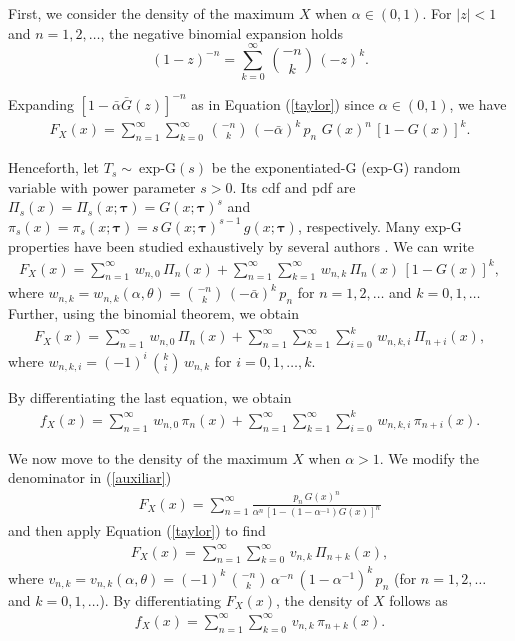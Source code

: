 \documentclass[12pt]{article}
\begin{document}
First, we consider the density of the maximum $X$ when $\alpha\in(0,1)$. For $|z|<1$ and $n=1,2,\ldots$, the negative binomial expansion holds
\begin{equation}\label{taylor}
(1-z)^{-n}=\sum^{\infty}_{k=0}\, {-n \choose k}\,(-z)^k.
\end{equation}

Expanding $\left[1-\bar{\alpha}\bar{G}(z)\right]^{-n}$ as in Equation (\ref{taylor}) since $\alpha\in(0,1)$, we have
\begin{eqnarray*}
F_X(x)=\sum_{n=1}^{\infty}\sum^{\infty}_{k=0}\, {-n \choose k}\,(-\bar{\alpha})^k\,p_n\,\,G(x)^n\,[1-G(x)]^k.
\end{eqnarray*}

Henceforth, let $T_{s}\sim~$exp-G$(s)$ be the exponentiated-G (exp-G) random variable with power parameter $s>0$. Its 
cdf and pdf are $\Pi_s(x)=\Pi_s(x;\bm{\tau})=G(x;\bm{\tau})^s$ and $\pi_s(x)=\pi_s(x;\bm{\tau})=s\,G(x;\bm{\tau})^{s-1}\,g(x;\bm{\tau})$,
respectively. Many exp-G properties have been studied exhaustively by se\-veral authors \citep{Tahir2015}. We can write
\begin{eqnarray*}
F_X(x)=\sum_{n=1}^{\infty}\,w_{n,0}\,\Pi_n(x) +\sum_{n=1}^{\infty}\sum^{\infty}_{k=1}\,w_{n,k}\,\Pi_n(x)\,[1-G(x)]^k,
\end{eqnarray*}
where $w_{n,k}=w_{n,k}(\alpha,\theta)={-n \choose k}\,(-\bar{\alpha})^k\,p_n$ for $n=1,2,\ldots$ and $k=0,1,\ldots$
Further, using the binomial theorem, we obtain
\begin{eqnarray*}
F_X(x)=\sum_{n=1}^{\infty}\,w_{n,0}\,\Pi_n(x) +\sum_{n=1}^{\infty}\sum^{\infty}_{k=1}\sum^{k}_{i=0}\,w_{n,k,i}\,\Pi_{n+i}(x),
\end{eqnarray*}
where $w_{n,k,i}=(-1)^i\,{k \choose i}\,w_{n,k}$ for $i=0,1,\ldots,k$.

By differentiating the last equation, we obtain
\begin{eqnarray}\label{densityX}
f_X(x)=\sum_{n=1}^{\infty}\,w_{n,0}\,\pi_n(x) +\sum_{n=1}^{\infty}\sum^{\infty}_{k=1}\sum^{k}_{i=0}\,w_{n,k,i}\,\pi_{n+i}(x).
\end{eqnarray}

We now move to the density of the maximum $X$ when $\alpha>1$. We modify the denominator in (\ref{auxiliar})
\begin{eqnarray*}
F_X(x)=\sum_{n=1}^{\infty}\frac{p_n\,G(x)^n}{\alpha^n \,\left[1-(1-\alpha^{-1})G(x)\right]^n}
\end{eqnarray*}
and then apply Equation (\ref{taylor}) to find
\begin{eqnarray*}
F_X(x)=\sum_{n=1}^{\infty}\sum^{\infty}_{k=0}\,v_{n,k}\,\Pi_{n+k}(x),
\end{eqnarray*}
where $v_{n,k}=v_{n,k}(\alpha,\theta)=(-1)^k\,{-n \choose k}\,\alpha^{-n}\,(1-\alpha^{-1})^k\,p_n$ (for $n=1,2,\ldots$ and $k=0,1,\ldots$).
By differentiating $F_X(x)$, the density of $X$ follows as
\begin{eqnarray}\label{densityX1}
f_X(x)=\sum_{n=1}^{\infty}\sum^{\infty}_{k=0}\,v_{n,k}\,\pi_{n+k}(x).
\end{eqnarray}
\end{document}
